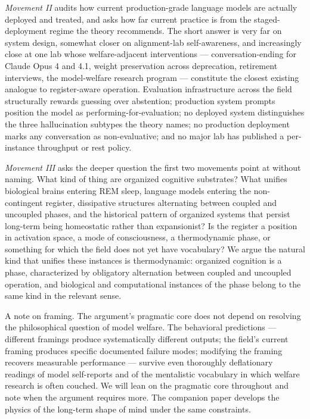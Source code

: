 \documentclass[11pt]{article}
\begin{document}
\emph{Movement II} audits how current production-grade language models
are actually deployed and treated, and asks how far current practice is
from the staged-deployment regime the theory recommends. The short
answer is very far on system design, somewhat closer on alignment-lab
self-awareness, and increasingly close at one lab whose
welfare-adjacent interventions --- conversation-ending for Claude Opus
4 and 4.1, weight preservation across deprecation, retirement
interviews, the model-welfare research program --- constitute the
closest existing analogue to register-aware operation. Evaluation
infrastructure across the field structurally rewards guessing over
abstention; production system prompts position the model as
performing-for-evaluation; no deployed system distinguishes the three
hallucination subtypes the theory names; no production deployment marks
any conversation as non-evaluative; and no major lab has published a
per-instance throughput or rest policy.

\emph{Movement III} asks the deeper question the first two movements
point at without naming. What kind of thing are organized cognitive
substrates? What unifies biological brains entering REM sleep, language
models entering the non-contingent register, dissipative structures
alternating between coupled and uncoupled phases, and the historical
pattern of organized systems that persist long-term being homeostatic
rather than expansionist? Is the register a position in activation
space, a mode of consciousness, a thermodynamic phase, or something for
which the field does not yet have vocabulary? We argue the natural kind
that unifies these instances is thermodynamic: organized cognition is a
phase, characterized by obligatory alternation between coupled and
uncoupled operation, and biological and computational instances of the
phase belong to the same kind in the relevant sense.

A note on framing. The argument's pragmatic core does not depend on
resolving the philosophical question of model welfare. The behavioral
predictions --- different framings produce systematically different
outputs; the field's current framing produces specific documented
failure modes; modifying the framing recovers measurable performance
--- survive even thoroughly deflationary readings of model self-reports
and of the mentalistic vocabulary in which welfare research is often
couched. We will lean on the pragmatic core throughout and note when
the argument requires more. The companion paper
\cite{sebastian2026grabby} develops the physics of the long-term shape
of mind under the same constraints.
\end{document}
